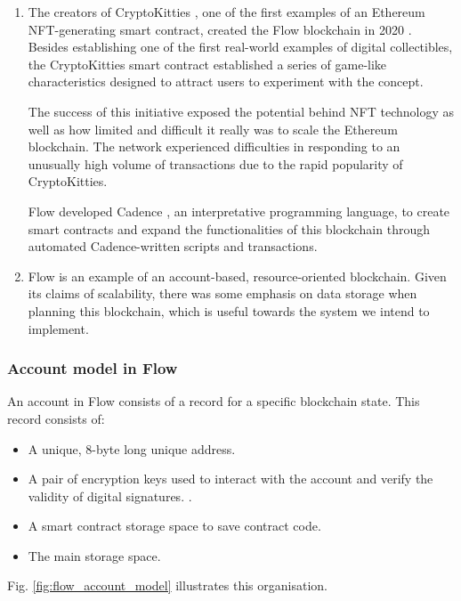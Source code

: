 \documentclass[./4_GeneralApproach.tex]{subfiles}
\begin{document}
\begin{enumerate}
    \item{The creators of CryptoKitties \cite{Gharegozlou2019}, one of the first examples of an Ethereum NFT-generating smart contract, created the Flow blockchain in 2020 \cite{Hentschel2019a}. Besides establishing one of the first real-world examples of digital collectibles, the CryptoKitties smart contract established a series of game-like characteristics designed to attract users to experiment with the concept.
          \par
          The success of this initiative exposed the potential behind NFT technology as well as how limited and difficult it really was to scale the Ethereum blockchain. The network experienced difficulties in responding to an unusually high volume of transactions due to the rapid popularity of CryptoKitties.
          \par
          Flow developed Cadence \cite{Cadence2023}, an interpretative programming language, to create smart contracts and expand the functionalities of this blockchain through automated Cadence-written scripts and transactions.}

    \item{Flow is an example of an account-based, resource-oriented blockchain. Given its claims of scalability, there was some emphasis on data storage when planning this blockchain, which is useful towards the system we intend to implement.}

\end{enumerate}

\subsubsection{Account model in Flow}
\label{sec:flow_accounts}
An account in Flow consists of a record for a specific blockchain state. This record consists of:

\begin{itemize}
    \item{A unique, 8-byte long unique address.}
    \item{A pair of encryption keys used to interact with the account and verify the validity of digital signatures. \cite{flow2024}}.
    \item{A smart contract storage space to save contract code.}
    \item{The main storage space.}
\end{itemize}

Fig. \ref{fig:flow_account_model} illustrates this organisation.
\end{document}

